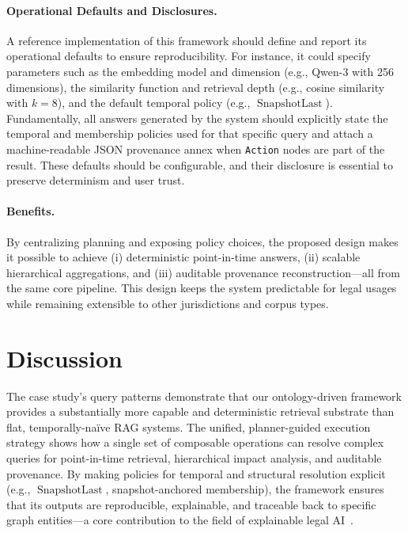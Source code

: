 \documentclass[11pt]{article}
\begin{document}
\paragraph{Operational Defaults and Disclosures.} A reference implementation of this framework should define and report its operational defaults to ensure reproducibility. For instance, it could specify parameters such as the embedding model and dimension (e.g., Qwen-3 with 256 dimensions), the similarity function and retrieval depth (e.g., cosine similarity with $k=8$), and the default temporal policy (e.g., \(\operatorname{SnapshotLast}\)). Fundamentally, all answers generated by the system should explicitly state the temporal and membership policies used for that specific query and attach a machine-readable JSON provenance annex when \texttt{Action} nodes are part of the result. These defaults should be configurable, and their disclosure is essential to preserve determinism and user trust.

\paragraph{Benefits.} By centralizing planning and exposing policy choices, the proposed design makes it possible to achieve (i) deterministic point-in-time answers, (ii) scalable hierarchical aggregations, and (iii) auditable provenance reconstruction—all from the same core pipeline. This design keeps the system predictable for legal usages while remaining extensible to other jurisdictions and corpus types.

\section{Discussion}
\label{sec:discussion}

The case study's query patterns demonstrate that our ontology-driven framework provides a substantially more capable and deterministic retrieval substrate than flat, temporally-naïve RAG systems. The unified, planner-guided execution strategy shows how a single set of composable operations can resolve complex queries for point-in-time retrieval, hierarchical impact analysis, and auditable provenance. By making policies for temporal and structural resolution explicit (e.g., \(\operatorname{SnapshotLast}\), snapshot-anchored membership), the framework ensures that its outputs are reproducible, explainable, and traceable back to specific graph entities—a core contribution to the field of explainable legal AI~\cite{richmond2024explainable}.
\end{document}
